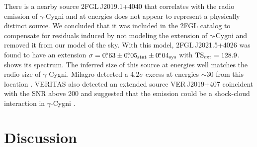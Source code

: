 There is a nearby source 2FGL\,J2019.1+4040 that correlates with the radio
emission of $\gamma$-Cygni and at \gev energies 
does not appear to represent a physically
distinct source.  We concluded that it was included in the 2FGL catalog to compensate
for residuals induced by not modeling the extension of $\gamma$-Cygni and
removed it from our model of the sky.  With this model, 2FGL\,J2021.5+4026
was found to have an extension $\sigma=0\mbox{$.\!\!^\circ$}63\pm0\mbox{$.\!\!^\circ$}05_\text{stat}\pm0\mbox{$.\!\!^\circ$}04_\text{sys}$
with $\mathrm{TS}_\mathrm{ext}=128.9$.  
shows its spectrum.  The inferred size of this source at \gev energies
well matches the radio size of $\gamma$-Cygni.  Milagro detected
a $4.2\sigma$ excess at energies $\sim 30$ \tev from this location
\citep{abdo_2009a_fermi/large-telescope,abdo_2009a_milagro-observations}.  VERITAS also detected an
extended source VER\,J2019+407 coincident with the SNR above 200 \gev
and suggested that the \tev emission could be a shock-cloud interaction
in $\gamma$-Cygni \citep{weinstein_2009a_veritas-survey}.


\section{Discussion}

